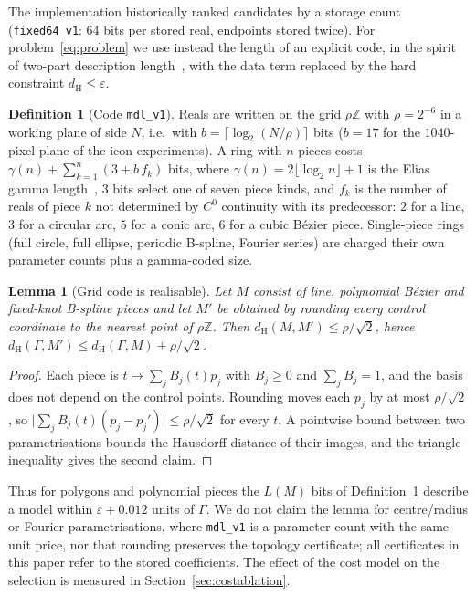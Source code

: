 \documentclass[11pt,a4paper]{article}
\newtheorem{lemma}[theorem]{Lemma}
\theoremstyle{definition}
\newtheorem{definition}[theorem]{Definition}
\theoremstyle{remark}
\newcommand{\dH}{d_{\mathrm{H}}}
\begin{document}
The implementation historically ranked candidates by a storage count
(\texttt{fixed64\_v1}: 64 bits per stored real, endpoints stored twice). For
problem~\eqref{eq:problem} we use instead the length of an explicit code, in
the spirit of two-part description length~\cite{rissanen1978}, with the data
term replaced by the hard constraint $\dH\le\varepsilon$.

\begin{definition}[Code \texttt{mdl\_v1}]\label{def:mdl}
Reals are written on the grid $\rho\mathbb{Z}$ with $\rho=2^{-6}$ in a
working plane of side $N$, i.e.\ with $b=\lceil\log_2(N/\rho)\rceil$ bits
($b=17$ for the $1040$-pixel plane of the icon experiments). A ring with $n$ pieces costs $\gamma(n)+\sum_{k=1}^{n}(3+b\,f_k)$ bits,
where $\gamma(n)=2\lfloor\log_2 n\rfloor+1$ is the Elias gamma
length~\cite{elias1975}, $3$ bits select one of seven piece kinds, and $f_k$ is
the number of reals of piece $k$ not determined by $C^0$ continuity with its
predecessor: $2$ for a line, $3$ for a circular arc, $5$ for a conic arc, $6$
for a cubic B\'ezier piece. Single-piece rings (full circle, full ellipse,
periodic B-spline, Fourier series) are charged their own parameter counts plus
a gamma-coded size.
\end{definition}

\begin{lemma}[Grid code is realisable]\label{lem:grid}
Let $M$ consist of line, polynomial B\'ezier and fixed-knot B-spline pieces
and let $M'$ be obtained by rounding every control coordinate to the nearest
point of $\rho\mathbb{Z}$. Then $\dH(M,M')\le\rho/\sqrt2$, hence
$\dH(\Gamma,M')\le\dH(\Gamma,M)+\rho/\sqrt2$.
\end{lemma}
\begin{proof}
Each piece is $t\mapsto\sum_j B_j(t)p_j$ with $B_j\ge0$ and $\sum_jB_j=1$,
and the basis does not depend on the control points. Rounding moves each $p_j$
by at most $\rho/\sqrt2$, so
$\lvert\sum_jB_j(t)(p_j-p_j')\rvert\le\rho/\sqrt2$ for every $t$. A pointwise
bound between two parametrisations bounds the Hausdorff distance of their
images, and the triangle inequality gives the second claim.
\end{proof}

Thus for polygons and polynomial pieces the $L(M)$ bits of
Definition~\ref{def:mdl} describe a model within $\varepsilon+0.012$ units of
$\Gamma$. We do not claim the lemma for centre/radius or Fourier
parametrisations, where \texttt{mdl\_v1} is a parameter count with the same
unit price, nor that rounding preserves the topology certificate; all
certificates in this paper refer to the stored coefficients. The effect of
the cost model on the selection is measured in
Section~\ref{sec:costablation}.
\end{document}
